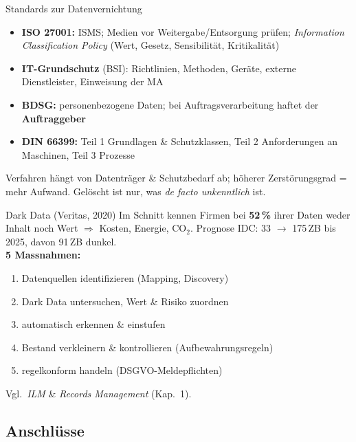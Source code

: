 \documentclass[a4paper, fontsize=7pt]{scrartcl}
\begin{document}
\begin{subbox}{Standards zur Datenvernichtung}
\begin{itemize}
    \item \textbf{ISO 27001:} ISMS; Medien vor Weitergabe/Entsorgung prüfen;
          \emph{Information Classification Policy} (Wert, Gesetz, Sensibilität,
          Kritikalität)
    \item \textbf{IT-Grundschutz} (BSI): Richtlinien, Methoden, Geräte, externe
          Dienstleister, Einweisung der MA
    \item \textbf{BDSG:} personenbezogene Daten; bei Auftragsverarbeitung
          haftet der \textbf{Auftraggeber}
    \item \textbf{DIN 66399:} Teil 1 Grundlagen \& Schutzklassen, Teil 2
          Anforderungen an Maschinen, Teil 3 Prozesse
\end{itemize}
Verfahren hängt von Datenträger \& Schutzbedarf ab; höherer Zerstörungsgrad =
mehr Aufwand. Gelöscht ist nur, was \emph{de facto unkenntlich} ist.
\end{subbox}

\begin{subbox}{Dark Data (Veritas, 2020)}
Im Schnitt kennen Firmen bei \textbf{52\,\%} ihrer Daten weder Inhalt noch Wert
$\Rightarrow$ Kosten, Energie, CO$_2$. Prognose IDC: 33 $\to$ 175\,ZB bis 2025,
davon 91\,ZB dunkel.\\
\textbf{5 Massnahmen:}
\begin{enumerate}
    \item Datenquellen identifizieren (Mapping, Discovery)
    \item Dark Data untersuchen, Wert \& Risiko zuordnen
    \item automatisch erkennen \& einstufen
    \item Bestand verkleinern \& kontrollieren (Aufbewahrungsregeln)
    \item regelkonform handeln (DSGVO-Meldepflichten)
\end{enumerate}
Vgl.\ \emph{ILM} \& \emph{Records Management} (Kap.\ 1).
\end{subbox}

\subsection{Anschlüsse}
\end{document}
